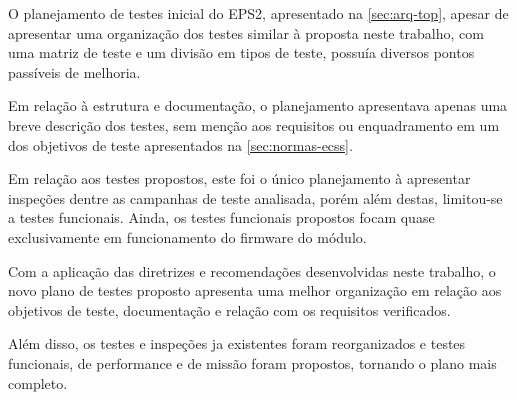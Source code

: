 O planejamento de testes inicial do \gls{EPS2}, apresentado na \autoref{sec:arq-top}, apesar de apresentar uma organização dos testes similar à proposta neste trabalho, com uma matriz de teste e um divisão em tipos de teste, possuía diversos pontos passíveis de melhoria.

Em relação à estrutura e documentação, o planejamento apresentava apenas uma breve descrição dos testes, sem menção aos requisitos ou enquadramento em um dos objetivos de teste apresentados na \autoref{sec:normas-ecss}.

Em relação aos testes propostos, este foi o único planejamento à apresentar inspeções dentre as campanhas de teste analisada, porém além destas, limitou-se a testes funcionais.
Ainda, os testes funcionais propostos focam quase exclusivamente em funcionamento do firmware do módulo.


Com a aplicação das diretrizes e recomendações desenvolvidas neste trabalho, o novo plano de testes proposto apresenta uma melhor organização em relação aos objetivos de teste,  documentação e relação com os requisitos verificados.

Além disso, os testes e inspeções ja existentes foram reorganizados e testes funcionais, de performance e de missão foram propostos, tornando o plano mais completo.